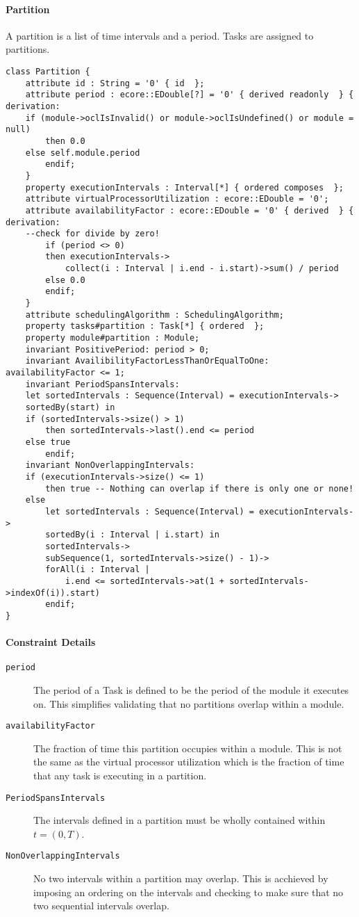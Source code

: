 \paragraph{Partition}
A partition is a list of time intervals and a period. Tasks are assigned to partitions.
\begin{lstlisting}[caption=Partition constraints]
class Partition {
    attribute id : String = '0' { id  };
    attribute period : ecore::EDouble[?] = '0' { derived readonly  } {
derivation:
	if (module->oclIsInvalid() or module->oclIsUndefined() or module = null)
	    then 0.0
	else self.module.period
	    endif;
    }
    property executionIntervals : Interval[*] { ordered composes  };
    attribute virtualProcessorUtilization : ecore::EDouble = '0';
    attribute availabilityFactor : ecore::EDouble = '0' { derived  } { derivation:
	--check for divide by zero!
	    if (period <> 0)
		then executionIntervals->
		    collect(i : Interval | i.end - i.start)->sum() / period
	    else 0.0
		endif;
    }
    attribute schedulingAlgorithm : SchedulingAlgorithm;
    property tasks#partition : Task[*] { ordered  };
    property module#partition : Module;
    invariant PositivePeriod: period > 0;
    invariant AvailibilityFactorLessThanOrEqualToOne: availabilityFactor <= 1;
    invariant PeriodSpansIntervals:
	let sortedIntervals : Sequence(Interval) = executionIntervals->
	sortedBy(start) in
	if (sortedIntervals->size() > 1)
	    then sortedIntervals->last().end <= period
	else true
	    endif;
    invariant NonOverlappingIntervals:
	if (executionIntervals->size() <= 1)
	    then true -- Nothing can overlap if there is only one or none!
	else
	    let sortedIntervals : Sequence(Interval) = executionIntervals->
		sortedBy(i : Interval | i.start) in
		sortedIntervals->
		subSequence(1, sortedIntervals->size() - 1)->
		forAll(i : Interval |
			i.end <= sortedIntervals->at(1 + sortedIntervals->indexOf(i)).start)
		endif;
}
\end{lstlisting}
\paragraph{Constraint Details}
\begin{description}
\item[\texttt{period}] The period of a Task is defined to be the period of the module it executes on.
This simplifies validating that no partitions overlap within a module.
\item[\texttt{availabilityFactor}] The fraction of time this partition occupies within a module. This
is not the same as the virtual processor utilization which is the fraction of time that any task
is executing in a partition.
\item[\texttt{PeriodSpansIntervals}] The intervals defined in a partition must be wholly contained
within $t = (0,T)$. 
\item[\texttt{NonOverlappingIntervals}] No two intervals within a partition may overlap. This is
acchieved by imposing an ordering on the intervals and checking to make sure that
no two sequential intervals overlap.
\end{description}
